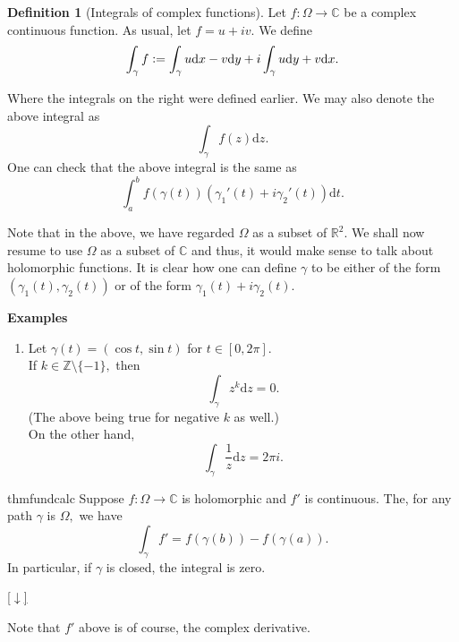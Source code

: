 \documentclass[12pt,oneside]{book}
\theoremstyle{definition}
\numberwithin{thm}{chapter}
\newtheorem{defn}[thm]{Definition}
\newcommand{\downsym}{[$\downarrow$]}
\begin{document}
\begin{defn}[Integrals of complex functions]
	Let $f:\Omega \to \mathbb{C}$ be a complex continuous function. As usual, let $f = u + iv.$ We define
	\begin{equation*} 
		\int_\gamma f \vcentcolon= \int_\gamma u\mathrm{d}x - v\mathrm{d}y + i\int_\gamma u\mathrm{d}y + v\mathrm{d}x.
	\end{equation*}
\end{defn}
Where the integrals on the right were defined earlier. We may also denote the above integral as
\begin{equation*} 
	\int_\gamma f(z)\mathrm{d}z.
\end{equation*}
One can check that the above integral is the same as
\begin{equation*} 
	\int_{a}^{b} f(\gamma(t))(\gamma_1'(t) + i\gamma_2'(t)) \mathrm{d}t.
\end{equation*}

Note that in the above, we have regarded $\Omega$ as a subset of $\mathbb{R}^2$. We shall now resume to use $\Omega$ as a subset of $\mathbb{C}$ and thus, it would make sense to talk about holomorphic functions. It is clear how one can define $\gamma$ to be either of the form $(\gamma_1(t), \gamma_2(t))$ or of the form $\gamma_1(t) + i\gamma_2(t).$

\textbf{Examples}
\begin{enumerate}
	\item Let $\gamma(t) = (\cos t, \sin t)$ for $t \in [0, 2\pi].$\\
	If $k \in \mathbb{Z}\setminus\{-1\},$ then
	\begin{equation*} 
		\int_\gamma z^k \mathrm{d}z = 0.
	\end{equation*}
	(The above being true for negative $k$ as well.)\\
	On the other hand,
	\begin{equation*} 
		\int_\gamma \dfrac{1}{z}\mathrm{d}z = 2\pi i.
	\end{equation*}
\end{enumerate}

\begin{restatable}[FTC]{thm}{fundcalc}
\label{thm:fundcalc}
	Suppose $f:\Omega \to \mathbb{C}$ is holomorphic and $f'$ is continuous. The, for any path $\gamma$ is $\Omega,$ we have
	\begin{equation*} 
		\int_\gamma f' = f(\gamma(b)) - f(\gamma(a)).
	\end{equation*}
	In particular, if $\gamma$ is closed, the integral is zero.
\end{restatable}
\begin{flushright}\hyperref[thm:fundcalc2]{\downsym}\end{flushright}
Note that $f'$ above is of course, the complex derivative.
\end{document}
